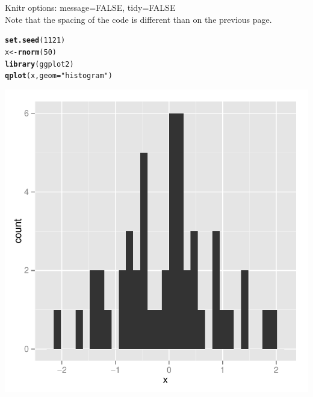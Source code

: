 \documentclass{article}\usepackage[]{graphicx}\usepackage[]{color}
\makeatletter
\newcommand{\hlnum}[1]{\textcolor[rgb]{0.686,0.059,0.569}{#1}}%
\newcommand{\hlstr}[1]{\textcolor[rgb]{0.192,0.494,0.8}{#1}}%
\newcommand{\hlstd}[1]{\textcolor[rgb]{0.345,0.345,0.345}{#1}}%
\newcommand{\hlkwb}[1]{\textcolor[rgb]{0.69,0.353,0.396}{#1}}%
\newcommand{\hlkwc}[1]{\textcolor[rgb]{0.333,0.667,0.333}{#1}}%
\newcommand{\hlkwd}[1]{\textcolor[rgb]{0.737,0.353,0.396}{\textbf{#1}}}%
\newenvironment{kframe}{%
 \def\at@end@of@kframe{}%
 \ifinner\ifhmode%
  \def\at@end@of@kframe{\end{minipage}}%
  \begin{minipage}{\columnwidth}%
 \fi\fi%
 \def\FrameCommand##1{\hskip\@totalleftmargin \hskip-\fboxsep
 \colorbox{shadecolor}{##1}\hskip-\fboxsep
     \hskip-\linewidth \hskip-\@totalleftmargin \hskip\columnwidth}%
 \MakeFramed {\advance\hsize-\width
   \@totalleftmargin\z@ \linewidth\hsize
   \@setminipage}}%
 {\par\unskip\endMakeFramed%
 \at@end@of@kframe}
\newenvironment{knitrout}{}{} %
\makeatother
\begin{document}
\clearpage
\noindent Knitr options: message=FALSE, tidy=FALSE\\
Note that the spacing of the code is different than on the previous page.
\begin{knitrout}
\color{fgcolor}\begin{kframe}
\begin{alltt}
\hlkwd{set.seed}\hlstd{(}\hlnum{1121}\hlstd{)}
\hlstd{x}\hlkwb{<-}\hlkwd{rnorm}\hlstd{(}\hlnum{50}\hlstd{)}
\hlkwd{library}\hlstd{(ggplot2)}
\hlkwd{qplot}\hlstd{(x,}\hlkwc{geom}\hlstd{=}\hlstr{"histogram"}\hlstd{)}
\end{alltt}
\end{kframe}

{\centering \includegraphics[width=\textwidth]{figure/pretty-histogram3} 

}



\end{knitrout}
\end{document}
